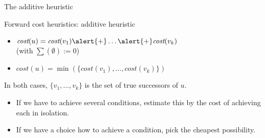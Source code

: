 \documentclass{gkibeamer}
\begin{document}
\begin{frame}{The additive heuristic}
  \begin{block}{Forward cost heuristics: additive heuristic \hadd}
    \begin{itemize}
    \item $\textit{cost}(u) = \textit{cost}(v_1) \alert{+} \dots
      \alert{+} \textit{cost}(v_k)$ \\
      (with $\sum(\emptyset) := 0$)
    \end{itemize}

    \begin{itemize}
    \item $\textit{cost}(u) = \min(\{\textit{cost}(v_1), \dots,
      \textit{cost}(v_k)\})$
    \end{itemize}

    In both cases, $\{v_1, \dots, v_k\}$ is the set of true
    successors of $u$.
  \end{block}

  \begin{itemize}
  \item {} If we have to achieve several conditions,
    estimate this by the cost of achieving \alert{each in isolation}.
  \item {} If we have a choice how to achieve a
    condition, pick the \alert{cheapest} possibility.
  \end{itemize}
\end{frame}
\end{document}
